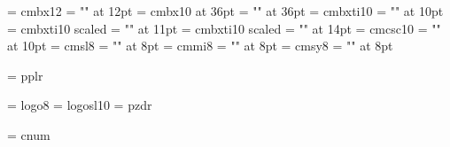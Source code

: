 \font\entwelvebf = cmbx12
\font\zhtwelvebf = "\hei" at 12pt
\def\twelvebf{\entwelvebf\let\zhfont\zhtwelvebf}
\font\enthirtysixbf = cmbx10 at 36pt
\font\zhthirtysixbf = "\hei" at 36pt
\def\thirtysixbf{\enthirtysixbf\let\zhfont\zhthirtysixbf}
%
\font\entenbi = cmbxti10
\font\zhtenbi = "\hei" at 10pt
\def\tenbi{\entenbi\let\zhfont\zhtenbi}
\font\enelevenbi= cmbxti10 scaled \magstephalf
\font\zhelevenbi = "\hei" at 11pt
\def\elevenbi{\enelevenbi\let\zhfont\zhelevenbi}
\font\enfourteenbi= cmbxti10 scaled 
\font\zhfourteenbi = "\hei" at 14pt
\def\fourteenbi{\enfourteenbi\let\zhfont\zhfourteenbi}
%
\font\entensc = cmcsc10
\font\zhtensc = "\fang" at 10pt
\def\tensc{\entensc\let\zhfont\zhtensc}
\font\eneightsl = cmsl8
\font\zheightsl = "\fang" at 8pt
\def\eightsl{\eneightsl\let\zhfont\zheightsl}
\font\eneighti = cmmi8
\font\zheighti = "\kai" at 8pt
\def\eighti{\eneighti\let\zhfont\zheighti}
\font\eneightsy = cmsy8
\font\zheightsy = "\song" at 8pt
\def\eightsy{\eneightsy\let\zhfont\zheightsy}

 
%
\font\tenpal = pplr

% 
\font\eightlogo = logo8
\font\logosl = logosl10
\font\handfont = pzdr

\ifmsdos
   \font\cnum = cnum %
   \let\chapternumeralfont = \cnum
\fi

\def\undefinedfont{\errmessage{Undefined font}}

% 
\def\clearfonts{\let\rm = \undefinedfont \let\bf = \undefinedfont
   \let\it = \undefinedfont \let\bi = \undefinedfont
   \let\tt = \undefinedfont \let\bt = \undefinedfont
   \let\sc = \undefinedfont
   \let\ss = \undefinedfont
}

